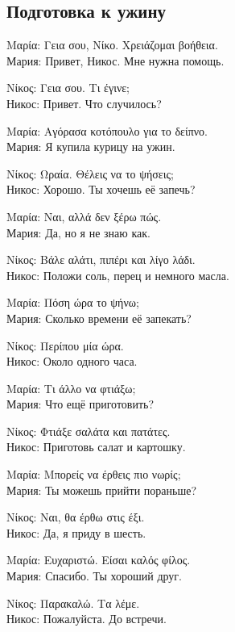 \documentclass[12pt]{article}
\newcommand{\my}[1]{\textcolor{gray!80!white}{#1}}
\newenvironment{page}{\clearpage\normalsize\null\vfill}{\vfill\null}
\newenvironment{textblock}{\begin{minipage}{\textwidth}}{\end{minipage}\smallskip}
\newcommand{\dialogright}[2]{%
	\par\begingroup\raggedleft
	#1\\
	\my{#2}\par
	\endgroup
}
\begin{document}
	\begin{page}
		\subsection{Подготовка к ужину}
		\scriptsize
		\begin{textblock}
			Μαρία: Γεια σου, Νίκο. Χρειάζομαι βοήθεια.\\
			\my{Мария: Привет, Никос. Мне нужна помощь.}
			
			\dialogright{Νίκος: Γεια σου. Τι έγινε;}{Никос: Привет. Что случилось?}
			
			Μαρία: Αγόρασα κοτόπουλο για το δείπνο.\\
			\my{Мария: Я купила курицу на ужин.}
			
			\dialogright{Νίκος: Ωραία. Θέλεις να το ψήσεις;}{Никос: Хорошо. Ты хочешь её запечь?}
			
			Μαρία: Ναι, αλλά δεν ξέρω πώς.\\
			\my{Мария: Да, но я не знаю как.}
			
			\dialogright{Νίκος: Βάλε αλάτι, πιπέρι και λίγο λάδι.}{Никос: Положи соль, перец и немного масла.}
			
			Μαρία: Πόση ώρα το ψήνω;\\
			\my{Мария: Сколько времени её запекать?}
			
			\dialogright{Νίκος: Περίπου μία ώρα.}{Никос: Около одного часа.}
			
			Μαρία: Τι άλλο να φτιάξω;\\
			\my{Мария: Что ещё приготовить?}
			
			\dialogright{Νίκος: Φτιάξε σαλάτα και πατάτες.}{Никос: Приготовь салат и картошку.}
			
			Μαρία: Μπορείς να έρθεις πιο νωρίς;\\
			\my{Мария: Ты можешь прийти пораньше?}
			
			\dialogright{Νίκος: Ναι, θα έρθω στις έξι.}{Никос: Да, я приду в шесть.}
			
			Μαρία: Ευχαριστώ. Είσαι καλός φίλος.\\
			\my{Мария: Спасибо. Ты хороший друг.}
			
			\dialogright{Νίκος: Παρακαλώ. Τα λέμε.}{Никос: Пожалуйста. До встречи.}
		\end{textblock}
	\end{page}
\end{document}
